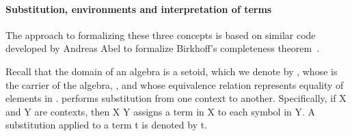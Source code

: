 \paragraph*{Substitution, environments and interpretation of terms}
The approach to formalizing these three concepts is based on similar code developed by
Andreas Abel to formalize Birkhoff's completeness theorem~\cite{Abel:2021}.
\ifshort\else

Recall that the domain of an algebra  is a setoid, which we denote by
, whose  is the carrier of the algebra, ,
and whose equivalence relation represents equality of elements in .
\fi
{} performs substitution from one context to
another.  Specifically, if \ab X and \ab Y are contexts, then  \ab X \ab Y
assigns a term in \ab X to each symbol in \ab Y.
A substitution  applied to a term \ab t is denoted by \af{[~\ab{σ}~]} \ab t.


